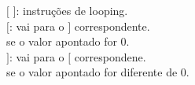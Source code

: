 \documentclass[preview]{standalone}
\begin{document}
$[$ $]$: instruções de looping.\\$[$: vai para o $]$ correspondente.\\se o valor apontado for 0.\\$]$: vai para o $[$ correspondene.\\se o valor apontado for diferente de 0.\\
\end{document}
